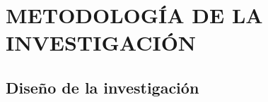 \chapter{METODOLOGÍA DE LA INVESTIGACIÓN}
\section{Diseño de la investigación}

\begin{comment}
En esta sección del documento se explicará cual es el diseño, el tipo y el enfoque del trabajo de
investigación, así como también la población y la muestra. 
\subsection{Diseño no experimental}
El diseño es no experimental longitudinal, ya que las variables no serán manipuladas y serán analizadas tal como se encuentran. Es decir, tanto los datos textuales (noticias) y el precio del cobre serán analizados sin ningún cambio aplicando técnicas de procesamiento de lenguaje natural y algoritmos de aprendizaje automático con la finalidad de crear un modelo productivo robusto y facilitar la predicción del cobre. Asimismo, la recolección de datos que se realizará será en un determinado periodo de tiempo. 

\subsection{Tipo explicativo}
El alcance de la presente investigación es explicativo debido a que se busca explicar el comportamiento volátil del precio del cobre en base a noticias de periódicos digitales y además predecirlo.

\subsection{Enfoque cuantitativo}
El enfoque esta investigación es cuantitativo dado que se empleará técnicas del procesamiento de lenguaje natural (NLP), las cuales conllevan a procesar los datos de tipo textual a numéricos (vectores de características) y con ello posteriormente usar técnicas estadísticas como la regresión lineal para la predicción del precio del cobre.



\section{Población y muestra}


\end{comment}
